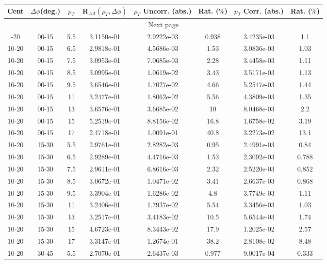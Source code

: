             
\begin{longtable}{|cccccccc|}
\hline
Cent & $\Delta\phi$(deg.) & $p_{T}$ & R$_{AA}(p_{T},\Delta\phi)$ & $p_{T}$ Uncorr. (abs.) & Rat. ($\%$) & $p_{T}$ Corr. (abs.) & Rat. ($\%$)  \\
\hline
\endhead
\hline \multicolumn{8}{|c|}{{Next page}} \\
\hline
\endfoot
\endlastfoot
\hline
10-20 & 00-15 & 5.5 & 3.1150e-01 & 2.9222e-03 & 0.938 & 3.4235e-03 & 1.1 \\ 
10-20 & 00-15 & 6.5 & 2.9818e-01 & 4.5686e-03 & 1.53 & 3.0836e-03 & 1.03 \\ 
10-20 & 00-15 & 7.5 & 3.0953e-01 & 7.0685e-03 & 2.28 & 3.4458e-03 & 1.11 \\ 
10-20 & 00-15 & 8.5 & 3.0995e-01 & 1.0619e-02 & 3.43 & 3.5171e-03 & 1.13 \\ 
10-20 & 00-15 & 9.5 & 3.6546e-01 & 1.7027e-02 & 4.66 & 5.2547e-03 & 1.44 \\ 
10-20 & 00-15 & 11 & 3.2477e-01 & 1.8062e-02 & 5.56 & 4.3809e-03 & 1.35 \\ 
10-20 & 00-15 & 13 & 3.6576e-01 & 3.6685e-02 & 10 & 8.0468e-03 & 2.2 \\ 
10-20 & 00-15 & 15 & 5.2519e-01 & 8.8156e-02 & 16.8 & 1.6758e-02 & 3.19 \\ 
10-20 & 00-15 & 17 & 2.4718e-01 & 1.0091e-01 & 40.8 & 3.2273e-02 & 13.1 \\ 
\hline
10-20 & 15-30 & 5.5 & 2.9761e-01 & 2.8282e-03 & 0.95 & 2.4991e-03 & 0.84 \\ 
10-20 & 15-30 & 6.5 & 2.9289e-01 & 4.4716e-03 & 1.53 & 2.3092e-03 & 0.788 \\ 
10-20 & 15-30 & 7.5 & 2.9611e-01 & 6.8616e-03 & 2.32 & 2.5220e-03 & 0.852 \\ 
10-20 & 15-30 & 8.5 & 3.0672e-01 & 1.0471e-02 & 3.41 & 2.6637e-03 & 0.868 \\ 
10-20 & 15-30 & 9.5 & 3.3904e-01 & 1.6286e-02 & 4.8 & 3.7749e-03 & 1.11 \\ 
10-20 & 15-30 & 11 & 3.2406e-01 & 1.7937e-02 & 5.54 & 3.3456e-03 & 1.03 \\ 
10-20 & 15-30 & 13 & 3.2517e-01 & 3.4183e-02 & 10.5 & 5.6544e-03 & 1.74 \\ 
10-20 & 15-30 & 15 & 4.6723e-01 & 8.3443e-02 & 17.9 & 1.2025e-02 & 2.57 \\ 
10-20 & 15-30 & 17 & 3.3147e-01 & 1.2674e-01 & 38.2 & 2.8108e-02 & 8.48 \\ 
\hline
10-20 & 30-45 & 5.5 & 2.7070e-01 & 2.6437e-03 & 0.977 & 9.0017e-04 & 0.333 \\ 

\end{longtable}
